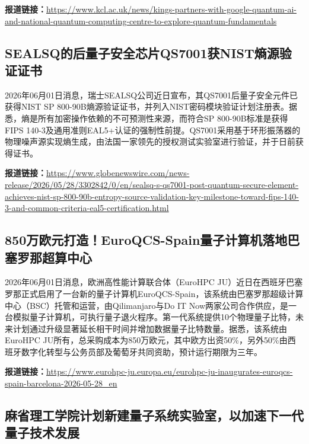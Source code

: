 \documentclass[12pt,a4paper]{ctexart}
\begin{document}
\noindent\textbf{报道链接：}\url{https://www.kcl.ac.uk/news/kings-partners-with-google-quantum-ai-and-national-quantum-computing-centre-to-explore-quantum-fundamentals}

\subsection{ SEALSQ的后量子安全芯片QS7001获NIST熵源验证证书 }

2026年06月01日消息，瑞士SEALSQ公司近日宣布，其QS7001后量子安全元件已获得NIST SP 800-90B熵源验证证书，并列入NIST密码模块验证计划注册表。据悉，熵是所有加密操作依赖的不可预测性来源，而符合SP 800-90B标准是获得FIPS 140-3及通用准则EAL5+认证的强制性前提。QS7001采用基于环形振荡器的物理噪声源实现熵生成，由法国一家领先的授权测试实验室进行验证，并于日前获得证书。

\noindent\textbf{报道链接：}\url{https://www.globenewswire.com/news-release/2026/05/28/3302842/0/en/sealsq-s-qs7001-post-quantum-secure-element-achieves-nist-sp-800-90b-entropy-source-validation-key-milestone-toward-fips-140-3-and-common-criteria-eal5-certification.html}

\subsection{ 850万欧元打造！EuroQCS-Spain量子计算机落地巴塞罗那超算中心 }

2026年06月01日消息，欧洲高性能计算联合体（EuroHPC JU）近日在西班牙巴塞罗那正式启用了一台新的量子计算机EuroQCS-Spain，该系统由巴塞罗那超级计算中心（BSC）托管和运营，由Qilimanjaro与Do IT Now两家公司合作供应，是一台模拟量子计算机，可执行量子退火程序。第一代系统提供10个物理量子比特，未来计划通过升级显著延长相干时间并增加数据量子比特数量。据悉，该系统由EuroHPC JU所有，总采购成本为850万欧元，其中欧方出资50\%，另外50\%由西班牙数字化转型与公务员部及葡萄牙共同资助，预计运行期限为三年。

\noindent\textbf{报道链接：}\url{https://www.eurohpc-ju.europa.eu/eurohpc-ju-inaugurates-euroqcs-spain-barcelona-2026-05-28\_en}

\subsection{ 麻省理工学院计划新建量子系统实验室，以加速下一代量子技术发展 }
\end{document}
